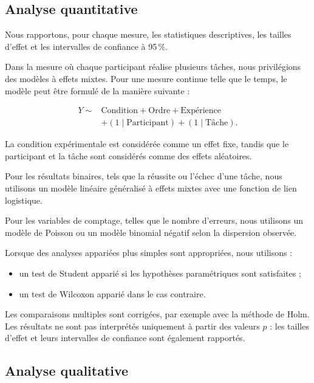 \subsection{Analyse quantitative}
\label{subsec:analyse-quantitative}

Nous rapportons, pour chaque mesure, les statistiques descriptives, les
tailles d'effet et les intervalles de confiance à 95\,\%.

Dans la mesure où chaque participant réalise plusieurs tâches, nous
privilégions des modèles à effets mixtes. Pour une mesure continue telle
que le temps, le modèle peut être formulé de la manière suivante :

\begin{equation}
\begin{aligned}
Y \sim {} & \text{Condition} + \text{Ordre} + \text{Expérience} \\
           & + (1 \mid \text{Participant})
             + (1 \mid \text{Tâche}).
\end{aligned}
\end{equation}

La condition expérimentale est considérée comme un effet fixe, tandis
que le participant et la tâche sont considérés comme des effets
aléatoires.

Pour les résultats binaires, tels que la réussite ou l'échec d'une
tâche, nous utilisons un modèle linéaire généralisé à effets mixtes avec
une fonction de lien logistique.

Pour les variables de comptage, telles que le nombre d'erreurs, nous
utilisons un modèle de Poisson ou un modèle binomial négatif selon la
dispersion observée.

Lorsque des analyses appariées plus simples sont appropriées, nous
utilisons :

\begin{itemize}
    \item un test de Student apparié si les hypothèses paramétriques
    sont satisfaites ;
    \item un test de Wilcoxon apparié dans le cas contraire.
\end{itemize}

Les comparaisons multiples sont corrigées, par exemple avec la méthode
de Holm. Les résultats ne sont pas interprétés uniquement à partir des
valeurs $p$ : les tailles d'effet et leurs intervalles de confiance sont
également rapportés.


\subsection{Analyse qualitative}
\label{subsec:analyse-qualitative}

